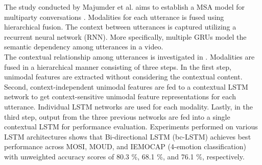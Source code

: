 The study conducted by Majumder et al. \cite{DialogueRNN_MAJUMDER2018124} aims to establish a MSA model for multiparty conversations \cite{HP_Advanced}. Modalities for each utterance is fused using hierarchical fusion. The context between utterances is captured utilizing a recurrent neural network (RNN). More specifically, multiple GRUs model the semantic dependency among utterances in a video. \\

The contextual relationship among utterances is investigated in \cite{bc-LSTM_poria2017context}. Modalities are fused in a hierarchical manner consisting of three steps. In the first step, unimodal features are extracted without considering the contextual content. Second, context-independent  unimodal features are fed to a contextual LSTM network to get context-sensitive unimodal feature representations for each utterance. Individual LSTM networks are used for each modality. Lastly, in the third step, output from the three previous networks are fed into a single contextual LSTM for performance evaluation. Experiments performed on various LSTM architectures shows that Bi-directional LSTM (bc-LSTM) achieves best performance across MOSI, MOUD, and IEMOCAP (4-emotion classification) with unweighted accuracy scores of 80.3 \%, 68.1 \%, and 76.1 \%, respectively. \\

